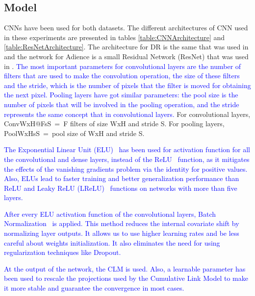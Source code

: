 \documentclass[journal]{IEEEtran}
\begin{document}
	\subsection{Model}
	\label{sect:model}
	CNNs have been used for both datasets. The different architectures of CNN used in these experiments are presented in tables \ref{table:CNNArchitecture} and \ref{table:ResNetArchitecture}. The architecture for DR is the same that was used in \cite{de2018weighted} and the network for Adience is a small Residual Network (ResNet) \cite{he2016deep} that was used in \cite{beckham2017unimodal}. \textcolor{blue}{The most important parameters for convolutional layers are the number of filters that are used to make the convolution operation, the size of these filters and the stride, which is the number of pixels that the filter is moved for obtaining the next pixel. Pooling layers have got similar parameters: the pool size is the number of pixels that will be involved in the pooling operation, and the stride represents the same concept that in convolutional layers.} For convolutional layers, ConvWxH@FsS~=~F filters of size WxH and stride S. For pooling layers, PoolWxHsS~=~pool size of WxH and stride S.
	
	\textcolor{blue}{The Exponential Linear Unit (ELU)~\cite{clevert2015fast} has been used for activation function for all the convolutional and dense layers, instead of the ReLU~\cite{nair2010rectified} function, as it mitigates the effects of the vanishing gradients problem \cite{bengio1994learning,pascanu2013difficulty} via the identity for positive values. Also, ELUs lead to faster training and better generalization performance than ReLU and Leaky ReLU (LReLU)~\cite{maas2013rectifier} functions on networks with more than five layers.}
	
	\textcolor{blue}{After every ELU activation function of the convolutional layers, Batch Normalization~\cite{ioffe2015batch} is applied. This method reduces the internal covariate shift by normalizing layer outputs. It allows us to use higher learning rates and be less careful about weights initialization. It also eliminates the need for using regularization techniques like Dropout.}
	
	\textcolor{blue}{At the output of the network, the CLM is used. Also, a learnable parameter has been used to rescale the projections used by the Cumulative Link Model to make it more stable and guarantee the convergence in most cases.} 
	
\end{document}
